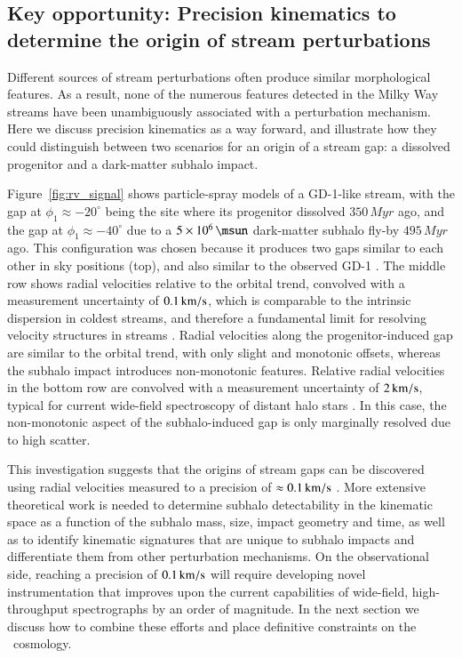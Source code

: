 \documentclass[final,5p,times,twocolumn,authoryear]{elsarticle}
\begin{document}
\subsection{Key opportunity: Precision kinematics to determine the origin of stream perturbations}
\label{sec:xkinematics}
Different sources of stream perturbations often produce similar morphological features.
As a result, none of the numerous features detected in the Milky Way streams have been unambiguously associated with a perturbation mechanism.
Here we discuss precision kinematics as a way forward, and illustrate how they could distinguish between two scenarios for an origin of a stream gap: a dissolved progenitor and a dark-matter subhalo impact.

Figure~\ref{fig:rv_signal} shows particle-spray models of a GD-1-like stream, with the gap at $\phi_1\approx-20^\circ$ being the site where its progenitor dissolved $350\,\unit{Myr}$ ago, and the gap at $\phi_1\approx-40^\circ$ due to a $5\times10^6\,\unit{\msun}$ dark-matter subhalo fly-by $495\,\unit{Myr}$ ago.
This configuration was chosen because it produces two gaps similar to each other in sky positions (top), and also similar to the observed GD-1 \citep[e.g.,][]{price-whelan:2018}.
The middle row shows radial velocities relative to the orbital trend, convolved with a measurement uncertainty of $0.1\,\unit{\kms}$, which is comparable to the intrinsic dispersion in coldest streams, and therefore a fundamental limit for resolving velocity structures in streams \citep{erkal}.
Radial velocities along the progenitor-induced gap are similar to the orbital trend, with only slight and monotonic offsets, whereas the subhalo impact introduces non-monotonic features.
Relative radial velocities in the bottom row are convolved with a measurement uncertainty of $2\,\unit{\kms}$, typical for current wide-field spectroscopy of distant halo stars \citep[e.g.,][]{li:, desi:, boss}.
In this case, the non-monotonic aspect of the subhalo-induced gap is only marginally resolved due to high scatter.

This investigation suggests that the origins of stream gaps can be discovered using radial velocities measured to a precision of $\approx0.1\,\unit{\kms}$ \citep[similar to findings by][]{erkal:}.
More extensive theoretical work is needed to determine subhalo detectability in the kinematic space as a function of the subhalo mass, size, impact geometry and time, as well as to identify kinematic signatures that are unique to subhalo impacts and differentiate them from other perturbation mechanisms.
On the observational side, reaching a precision of $0.1\,\unit{\kms}$ will require developing novel instrumentation that improves upon the current capabilities of wide-field, high-throughput spectrographs by an order of magnitude.
In the next section we discuss how to combine these efforts and place definitive constraints on the \lcdm\ cosmology.
\end{document}
